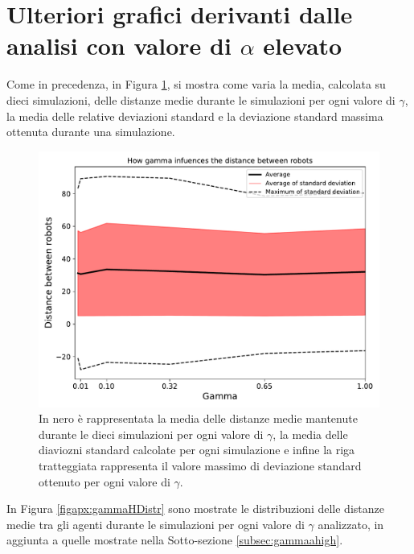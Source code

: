 \section{Ulteriori grafici derivanti dalle analisi con valore di $\alpha$ elevato}
Come in precedenza, in Figura \ref{figapx:gammavsdistanceH}, si mostra come varia la media, calcolata su dieci simulazioni, delle distanze medie durante le simulazioni per ogni valore di $\gamma$, la media delle relative deviazioni standard e la deviazione standard massima ottenuta durante una simulazione.
\begin{figure}
	\centering
	\includegraphics[width=0.9\linewidth]{images/gamma_results/high_alpha/gamma_vs_distance}
	\caption{In nero è rappresentata la media delle distanze medie mantenute durante le dieci simulazioni per ogni valore di $\gamma$, la media delle diaviozni standard calcolate per ogni simulazione e infine la riga tratteggiata rappresenta il valore massimo di deviazione standard ottenuto per ogni valore di $\gamma$.}
	\label{figapx:gammavsdistanceH}
\end{figure}
In Figura \ref{figapx:gammaHDistr} sono mostrate le distribuzioni delle distanze medie tra gli agenti durante le simulazioni per ogni valore di $\gamma$ analizzato, in aggiunta a quelle mostrate nella Sotto-sezione \ref{subsec:gammaahigh}.\\
